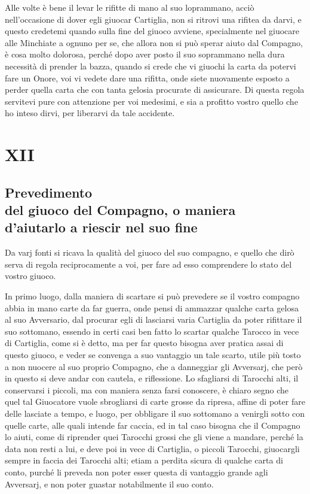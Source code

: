 \documentclass[11pt,a6paper]{article}
\begin{document}
Alle volte è bene il levar le rifitte di mano al suo loprammano, acciò nell'occasione di dover egli giuocar Cartiglia, non si ritrovi una rifitea da darvi, e questo credetemi quando sulla fine del giuoco avviene, specialmente nel giuocare alle Minchiate a ognuno per se, che allora non si può sperar aiuto dal Compagno, è cosa molto dolorosa, perché dopo aver posto il suo soprammano nella dura necessità di prender la bazza, quando si crede che vi giuochi la carta da potervi fare un Onore, voi vi vedete dare una rifitta, onde siete nuovamente esposto a perder quella carta che con tanta gelosia procurate di assicurare. Di questa regola servitevi pure con attenzione per voi medesimi, e sia a profitto vostro quello che ho inteso dirvi, per liberarvi da tale accidente.

\section{XII}
\subsection*{Prevedimento\\ del giuoco del Compagno, o maniera\\ d'aiutarlo a riescir nel suo fine}

Da varj fonti si ricava la qualità del
giuoco del suo compagno, e quello che dirò serva di regola reciprocamente a voi, per fare ad esso comprendere lo stato del vostro giuoco.

In primo luogo, dalla maniera di scartare si può prevedere se il vostro compagno abbia in mano carte da far guerra, onde pensi di ammazzar qualche carta 
gelosa al suo Avversario, dal procurar egli di lasciarsi varia Cartiglia da poter rifittare il suo sottomano, essendo in certi casi ben fatto lo scartar qualche Tarocco in vece di Cartiglia, come si è detto, ma per far questo bisogna aver pratica assai di questo giuoco, e veder se convenga a suo vantaggio un tale scarto, utile più tosto a non nuocere al suo proprio Compagno, che a danneggiar gli Avversarj, che però in questo si deve andar con cautela, e riflessione. Lo sfagliarsi di Tarocchi alti, il conservarsi i piccoli, ma con maniera senza farsi conoscere, è chiaro segno che quel tal Giuocatore vuole sbrogliarsi di carte grosse da ripresa, affine di poter fare delle lasciate a tempo, e luogo, per obbligare il suo sottomano a venirgli sotto con quelle carte, alle quali intende far caccia, ed in tal caso bisogna che il Compagno lo aiuti, come di riprender quei Tarocchi grossi che gli viene a mandare, perché la data non resti a lui, e deve poi in vece di Cartiglia, o piccoli Tarocchi, giuocargli sempre in faccia dei Tarocchi alti; etiam a perdita sicura di
qualche carta di conto, purché li preveda non poter esser questa di vantaggio grande agli Avversarj, e non poter guastar notabilmente il suo conto.
\end{document}
